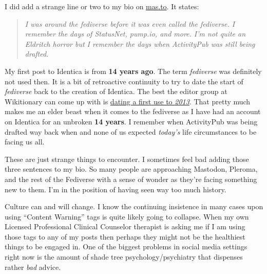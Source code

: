 I did add a strange line or two to my bio on
\href{https://mas.to/@smkellat}{mas.to}. It states:

\begin{quote}
\emph{I was around the fediverse before it was even called the
fediverse. I remember the days of StatusNet, pump.io, and more. I'm not
quite an Eldritch horror but I remember the days when ActivityPub was
still being drafted.}
\end{quote}

My first post to Identica is from \textbf{14 years ago}. The term
\emph{fediverse} was definitely not used then. It is a bit of
retroactive continuity to try to date the start of \emph{fediverse} back
to the creation of Identica. The best the editor group at Wikitionary
can come up with is
\href{https://lists.w3.org/Archives/Public/public-fedsocweb/2013Oct/0005.html}{dating
a first use to \emph{2013}}. That pretty much makes me an elder beast
when it comes to the fediverse as I have had an account on Identica for
an unbroken \textbf{14 years}. I remember when ActivityPub was being
drafted way back when and none of us expected \emph{today's} life
circumstances to be facing us all.

These are just strange things to encounter. I sometimes feel bad adding
those three sentences to my bio. So many people are approaching
Mastodon, Pleroma, and the rest of the Fediverse with a sense of wonder
as they're facing something new to them. I'm in the position of having
seen way too much history.

Culture can and will change. I know the continuing insistence in many
cases upon using ``Content Warning'' tags is quite likely going to
collapse. When my own Licensed Professional Clinical Counselor therapist
is asking me if I am using those tags to any of my posts then perhaps
they might not be the healthiest things to be engaged in. One of the
biggest problems in social media settings right now is the amount of
shade tree psychology/psychiatry that dispenses rather \emph{bad}
advice.
